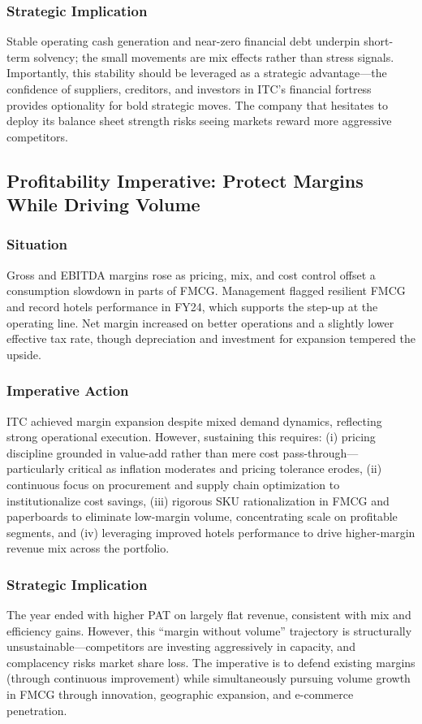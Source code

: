 \documentclass[12pt, a4paper]{report}
\begin{document}
\subsubsection{Strategic Implication}
Stable operating cash generation and near-zero financial debt underpin short-term solvency; the small movements are mix effects rather than stress signals. Importantly, this stability should be leveraged as a strategic advantage—the confidence of suppliers, creditors, and investors in ITC's financial fortress provides optionality for bold strategic moves. The company that hesitates to deploy its balance sheet strength risks seeing markets reward more aggressive competitors.

\subsection{Profitability Imperative: Protect Margins While Driving Volume}

\subsubsection{Situation}
Gross and EBITDA margins rose as pricing, mix, and cost control offset a consumption slowdown in parts of FMCG. Management flagged resilient FMCG and record hotels performance in FY24, which supports the step-up at the operating line. Net margin increased on better operations and a slightly lower effective tax rate, though depreciation and investment for expansion tempered the upside.

\subsubsection{Imperative Action}
ITC achieved margin expansion despite mixed demand dynamics, reflecting strong operational execution. However, sustaining this requires: (i) pricing discipline grounded in value-add rather than mere cost pass-through—particularly critical as inflation moderates and pricing tolerance erodes, (ii) continuous focus on procurement and supply chain optimization to institutionalize cost savings, (iii) rigorous SKU rationalization in FMCG and paperboards to eliminate low-margin volume, concentrating scale on profitable segments, and (iv) leveraging improved hotels performance to drive higher-margin revenue mix across the portfolio.

\subsubsection{Strategic Implication}
The year ended with higher PAT on largely flat revenue, consistent with mix and efficiency gains. However, this ``margin without volume'' trajectory is structurally unsustainable—competitors are investing aggressively in capacity, and complacency risks market share loss. The imperative is to defend existing margins (through continuous improvement) while simultaneously pursuing volume growth in FMCG through innovation, geographic expansion, and e-commerce penetration.
\end{document}
